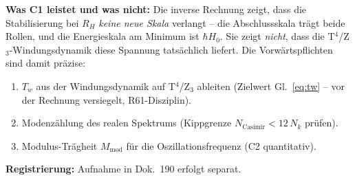 \documentclass[11pt]{report}
\begin{document}
\medskip
\noindent\textbf{Was C1 leistet und was nicht:} Die inverse Rechnung
zeigt, dass die Stabilisierung bei $R_H$ \emph{keine neue Skala}
verlangt -- die Abschlussskala trägt beide Rollen, und die
Energieskala am Minimum ist $\hbar H_0$. Sie zeigt \emph{nicht},
dass die T$^4$/Z$_3$-Windungsdynamik diese Spannung tatsächlich
liefert. Die Vorwärtspflichten sind damit präzise:

\begin{enumerate}
  \item $T_w$ aus der Windungsdynamik auf T$^4$/Z$_3$ ableiten
        (Zielwert Gl.~\eqref{eq:tw} -- vor der Rechnung versiegelt,
        R61-Disziplin).
  \item Modenzählung des realen Spektrums (Kippgrenze
        $N_\text{Casimir} < 12\,N_k$ prüfen).
  \item Modulus-Trägheit $M_\text{mod}$ für die
        Oszillationsfrequenz (C2 quantitativ).
\end{enumerate}

\noindent\textbf{Registrierung:} Aufnahme in Dok.~190 erfolgt
separat.
\end{document}
